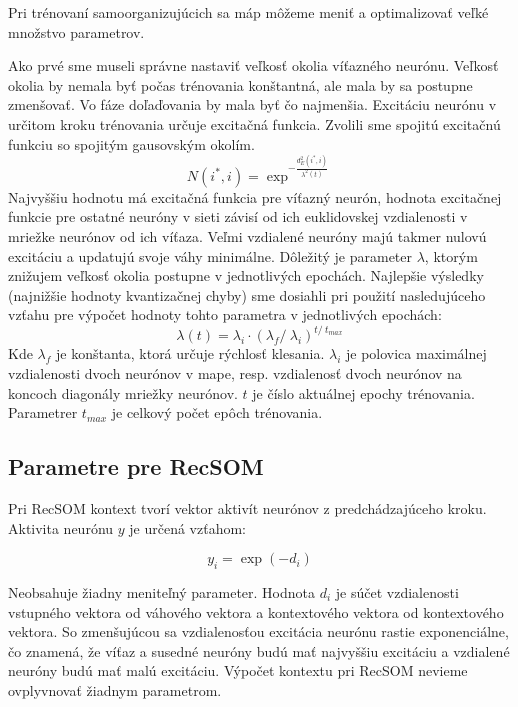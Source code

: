 Pri trénovaní samoorganizujúcich sa máp môžeme meniť a optimalizovať veľké množstvo parametrov. 

Ako prvé sme museli správne nastaviť veľkosť okolia víťazného neurónu.
Veľkosť okolia by nemala byť počas trénovania konštantná, ale mala by sa postupne zmenšovať.
Vo fáze doľaďovania by mala byť čo najmenšia.
Excitáciu neurónu v určitom kroku trénovania určuje excitačná funkcia. Zvolili sme spojitú
excitačnú funkciu so spojitým gausovským okolím. 
\begin{equation}
    N(i^{*}, i) = \exp^{- \frac{d^{2}_{E}(i^{*}, i)}{\lambda^{2}(t)}}
\end{equation}
Najvyššiu hodnotu má excitačná funkcia pre víťazný neurón, hodnota excitačnej funkcie pre ostatné 
neuróny v sieti závisí od ich euklidovskej vzdialenosti v mriežke neurónov od ich víťaza. Veľmi vzdialené neuróny 
majú takmer nulovú excitáciu a updatujú svoje váhy minimálne.
Dôležitý je parameter $\lambda$, ktorým znižujem veľkosť okolia postupne v jednotlivých epochách.
Najlepšie výsledky (najnižšie hodnoty kvantizačnej chyby) sme dosiahli pri použití nasledujúceho vzťahu pre výpočet hodnoty tohto parametra
v jednotlivých epochách:
\begin{equation}
    \lambda{(t)} = \lambda_{i} \cdot (\lambda_{f} /\ \lambda_{i})^{t /\ t_{max}}
\end{equation}
Kde $\lambda_{f}$ je konštanta, ktorá určuje rýchlosť klesania. 
$\lambda_{i}$ je polovica maximálnej vzdialenosti dvoch neurónov v mape, resp. 
vzdialenosť dvoch neurónov na koncoch diagonály mriežky neurónov.
$t$ je číslo aktuálnej epochy trénovania. Parametrer $t_{max}$ je celkový počet 
epôch trénovania.


\subsection{Parametre pre RecSOM}
Pri RecSOM kontext tvorí vektor aktivít neurónov z predchádzajúceho kroku.
Aktivita neurónu $y$ je určená vzťahom:

\begin{equation}
    y_{i} = \exp{(-d_{i})}
\end{equation}

Neobsahuje žiadny meniteľný parameter. Hodnota $d_{i}$ je súčet vzdialenosti vstupného vektora od váhového vektora a kontextového vektora od 
kontextového vektora. So zmenšujúcou sa vzdialenosťou excitácia neurónu rastie exponenciálne, čo 
znamená, že víťaz a susedné neuróny budú mať najvyššiu excitáciu a vzdialené neuróny budú mať malú excitáciu.
Výpočet kontextu pri RecSOM nevieme ovplyvnovať žiadnym parametrom.

